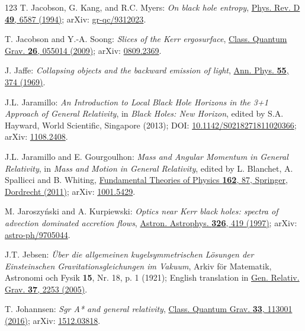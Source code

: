 \begin{thebibliography}{123}
T. Jacobson, G. Kang, and R.C. Myers:
{\em On black hole entropy},
\href{https://doi.org/10.1103/PhysRevD.49.6587}{Phys. Rev. D {\bf 49}, 6587 (1994)};
arXiv: \href{https://arxiv.org/abs/gr-qc/9312023}{gr-qc/9312023}.

T. Jacobson and Y.-A. Soong:
{\em Slices of the Kerr ergosurface},
\href{https://doi.org/10.1088/0264-9381/26/5/055014}{Class. Quantum Grav. {\bf 26}, 055014 (2009)};
arXiv: \href{https://arxiv.org/abs/0809.2369}{0809.2369}.

J. Jaffe:
{\em Collapsing objects and the backward emission of light},
\href{https://doi.org/10.1016/0003-4916(69)90184-5}{Ann. Phys. {\bf 55}, 374 (1969)}.

J.L. Jaramillo: {\em An Introduction to Local Black Hole Horizons in the 3+1
Approach of General Relativity}, in {\em Black Holes: New Horizon}, edited
by S.A. Hayward, World Scientific, Singapore (2013);
DOI: \href{https://doi.org/10.1142/S0218271811020366}{10.1142/S0218271811020366};
arXiv: \href{https://arxiv.org/abs/1108.2408}{1108.2408}.

J.L. Jaramillo and E. Gourgoulhon:
{\em Mass and Angular Momentum in General Relativity},
in \emph{Mass and Motion in General Relativity}, edited by L. Blanchet, A. Spallicci and B. Whiting, \href{https://doi.org/10.1007/978-90-481-3015-3_4}{Fundamental Theories of Physics {\bf 162}, 87,
Springer, Dordrecht (2011)};
arXiv: \href{https://arxiv.org/abs/1001.5429}{1001.5429}.

M. Jaroszy\'nski and A. Kurpiewski:
{\em Optics near Kerr black holes: spectra of advection dominated accretion flows},
\href{https://ui.adsabs.harvard.edu/abs/1997A&A...326..419J}{Astron. Astrophys. {\bf 326}, 419 (1997)};
arXiv: \href{https://arxiv.org/abs/astro-ph/9705044}{astro-ph/9705044}.

J.T. Jebsen:
{\em Über die allgemeinen kugelsymmetrischen Lösungen der Einsteinschen
Gravitationsgleichungen im Vakuum},
Arkiv för Matematik, Astronomi och Fysik {\bf 15}, Nr. 18, p. 1 (1921);
English translation in
\href{https://doi.org/10.1007/s10714-005-0168-y}{Gen. Relativ. Grav. {\bf 37}, 2253 (2005)}.

T. Johannsen:
{\em Sgr A* and general relativity},
\href{https://doi.org/10.1088/0264-9381/33/11/113001}{Class. Quantum Grav.  {\bf 33}, 113001 (2016)};
arXiv: \href{https://arxiv.org/abs/1512.03818}{1512.03818}.


\end{thebibliography}
